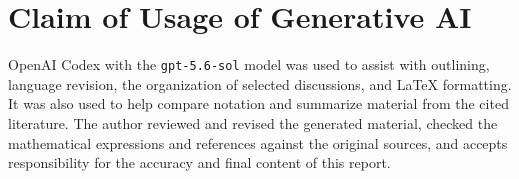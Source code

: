 \documentclass[00-main.tex]{subfiles}
\begin{document}
\section{Claim of Usage of Generative AI}

OpenAI Codex with the \texttt{gpt-5.6-sol} model was used to assist with outlining, language revision, the organization of selected discussions, and LaTeX formatting.
It was also used to help compare notation and summarize material from the cited literature.
The author reviewed and revised the generated material, checked the mathematical expressions and references against the original sources, and accepts responsibility for the accuracy and final content of this report.

\ifSubfilesClassLoaded{\printbibliography}{}
\end{document}
